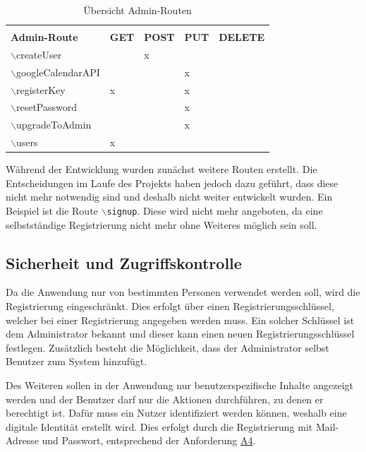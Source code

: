 \begin{table}[h]
	\centering
	\renewcommand*{\arraystretch}{1.25}
	\begin{tabular}{|l|P{2cm}|P{2cm}|P{2cm}|P{2cm}|}
		\hline &&\\[-0.6em]
		\textbf{Admin-Route} & \textbf{GET} & \textbf{POST} & \textbf{PUT} & \textbf{DELETE} \\ \hline
		$\backslash$createUser & & x & & \\ \hline
		$\backslash$googleCalendarAPI & & & x & \\ \hline
		$\backslash$registerKey & x & & x & \\ \hline
		$\backslash$resetPassword & & & x & \\ \hline
		$\backslash$upgradeToAdmin & & & x & \\ \hline
		$\backslash$users & x & & & \\ \hline
	\end{tabular}
	\captionsetup{format=hang}
	\caption{\label{tab:adminrouten}Übersicht Admin-Routen \\}
\end{table}

Während der Entwicklung wurden zunächst weitere Routen erstellt.
Die Entscheidungen im Laufe des Projekts haben jedoch dazu geführt, dass diese nicht mehr notwendig sind und deshalb nicht weiter entwickelt wurden.
Ein Beispiel ist die Route \texttt{$\backslash$signup}.
Diese wird nicht mehr angeboten, da eine selbstständige Registrierung nicht mehr ohne Weiteres möglich sein soll.

\subsection{Sicherheit und Zugriffskontrolle}
Da die Anwendung nur von bestimmten Personen verwendet werden soll, wird die Registrierung eingeschränkt.
Dies erfolgt über einen Registrierungsschlüssel, welcher bei einer Registrierung angegeben werden muss.
Ein solcher Schlüssel ist dem Administrator bekannt und dieser kann einen neuen Registrierungsschlüssel festlegen.
Zusätzlich besteht die Möglichkeit, dass der Administrator selbst Benutzer zum System hinzufügt. 

Des Weiteren sollen in der Anwendung nur benutzerspezifische Inhalte angezeigt werden und der Benutzer darf nur die Aktionen durchführen, zu denen er berechtigt ist.
Dafür muss ein Nutzer identifiziert werden können, weshalb eine digitale Identität erstellt wird.
Dies erfolgt durch die Registrierung mit Mail-Adresse und Passwort, entsprechend der Anforderung \hyperref[tab:Anforderungen]{A4}.

